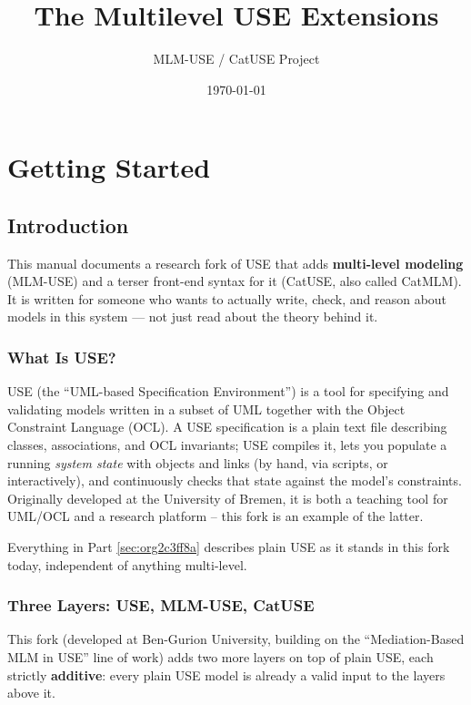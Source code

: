 \documentclass[11pt,twoside,a4paper]{book}
\author{MLM-USE / CatUSE Project}
\date{\today}
\title{The Multilevel USE Extensions}
\begin{document}
\maketitle
\tableofcontents

\frontmatter
\mainmatter

\part{Getting Started}
\label{sec:org3abc47a}
\chapter{Introduction}
\label{sec:orgcb60dbc}
This manual documents a research fork of USE that adds \textbf{multi-level
modeling} (MLM-USE) and a terser front-end syntax for it (CatUSE, also
called CatMLM). It is written for someone who wants to actually write,
check, and reason about models in this system --- not just read about
the theory behind it.

\section{What Is USE?}
\label{sec:org3d2738d}

USE (the ``UML-based Specification Environment'') is a tool for
specifying and validating models written in a subset of UML together
with the Object Constraint Language (OCL). A USE specification is a
plain text file describing classes, associations, and OCL invariants;
USE compiles it, lets you populate a running \emph{system state} with
objects and links (by hand, via scripts, or interactively), and
continuously checks that state against the model's constraints.
Originally developed at the University of Bremen, it is both a
teaching tool for UML/OCL and a research platform -- this fork is an
example of the latter.

Everything in Part \ref{sec:org2c3ff8a} describes plain USE as it stands
in this fork today, independent of anything multi-level.

\section{Three Layers: USE, MLM-USE, CatUSE}
\label{sec:org831f152}

This fork (developed at Ben-Gurion University, building on the
``Mediation-Based MLM in USE'' line of work) adds two more layers on top
of plain USE, each strictly \textbf{additive}: every plain USE model is
already a valid input to the layers above it.
\end{document}
